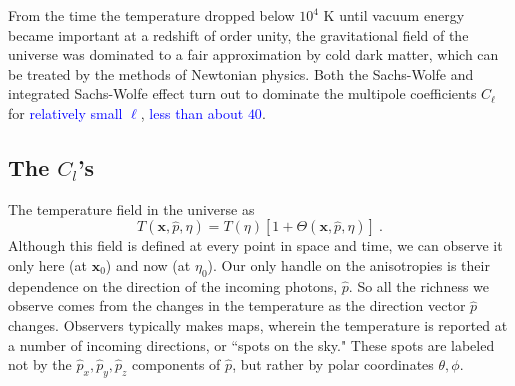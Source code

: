 \documentclass[12pt,a4paper]{article}
\renewcommand{\vec}[1]{\boldsymbol{#1}}
\begin{document}
From the time the temperature dropped below $10^4$ K until vacuum energy became important at a redshift of order unity, the gravitational field of the universe was dominated to a fair approximation by cold dark matter, which can be treated by the
methods of Newtonian physics. Both the Sachs-Wolfe and integrated Sachs-Wolfe effect turn out to dominate the multipole coefficients $C_\ell$ for \textcolor{blue}{relatively small $\ell$}, \textcolor{blue}{less than about $40$}. 


















































\subsection{The $C_l$'s}
\cite{2003moco.book.....D} The temperature field in the universe as 
\begin{equation}
T(\vec{x}, \hat{p}, \eta) = T(\eta) [1+\Theta(\vec{x}, \hat{p}, \eta)] ~.
\end{equation}
Although this field is defined at every point in space and time, we can observe it only here (at $\vec{x}_0$) and now (at $\eta_0$). Our only handle on the anisotropies is their dependence on the direction of the incoming photons, $\hat{p}$. So all the richness we observe comes from the changes in the temperature as the direction vector $\hat{p}$ changes. Observers typically makes maps, wherein the temperature is reported at a number of incoming directions, or ``spots on the sky." These spots are labeled not by the $\hat{p}_x, \hat{p}_y, \hat{p}_z$ components of $\hat{p}$, but rather by polar coordinates $\theta, \phi$. 
\end{document}
